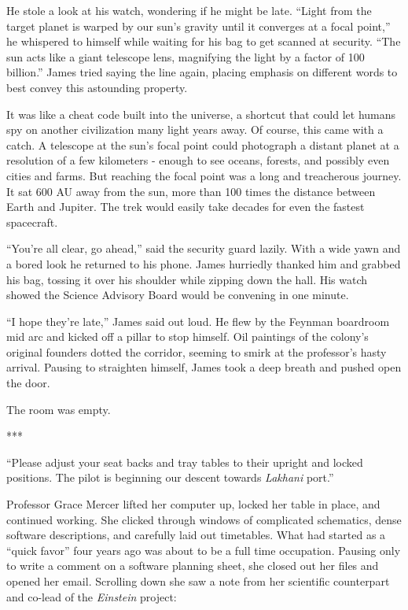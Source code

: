 \documentclass[openany, 12pt]{book} %
\begin{document}
He stole a look at his watch, wondering if he might be late. ``Light from the target planet is warped by our sun's gravity until it converges at a focal point,'' he whispered to himself while waiting for his bag to get scanned at security. ``The sun acts like a giant telescope lens, magnifying the light by a factor of 100 billion.'' James tried saying the line again, placing emphasis on different words to best convey this astounding property.

It was like a cheat code built into the universe, a shortcut that could let humans spy on another civilization many light years away. Of course, this came with a catch. A telescope at the sun's focal point could photograph a distant planet at a resolution of a few kilometers - enough to see oceans, forests, and possibly even cities and farms. But reaching the focal point was a long and treacherous journey. It sat 600 AU away from the sun, more than 100 times the distance between Earth and Jupiter. The trek would easily take decades for even the fastest spacecraft.

``You're all clear, go ahead,'' said the security guard lazily. With a wide yawn and a bored look he returned to his phone. James hurriedly thanked him and grabbed his bag, tossing it over his shoulder while zipping down the hall. His watch showed the Science Advisory Board would be convening in one minute.

``I hope they're late,'' James said out loud. He flew by the Feynman boardroom mid arc and kicked off a pillar to stop himself. Oil paintings of the colony's original founders dotted the corridor, seeming to smirk at the professor's hasty arrival. Pausing to straighten himself, James took a deep breath and pushed open the door.

The room was empty.

\begin{center}
***
\end{center}

``Please adjust your seat backs and tray tables to their upright and locked positions. The pilot is beginning our descent towards \textit{Lakhani} port.''

Professor Grace Mercer lifted her computer up, locked her table in place, and continued working. She clicked through windows of complicated schematics, dense software descriptions, and carefully laid out timetables. What had started as a ``quick favor'' four years ago was about to be a full time occupation. Pausing only to write a comment on a software planning sheet, she closed out her files and opened her email. Scrolling down she saw a note from her scientific counterpart and co-lead of the \textit{Einstein} project:
\end{document}
